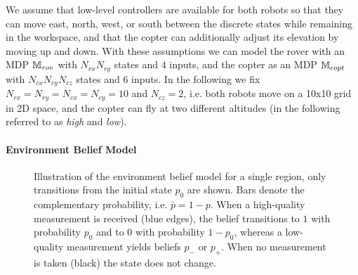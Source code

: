 \documentclass[conference]{IEEEtran}
\begin{document}
We assume that low-level controllers are available for both robots so that they can move east, north, west, or south between the discrete states while remaining in the workspace, and that the copter can additionally adjust its elevation by moving up and down. With these assumptions we can model the rover with an MDP $\mathbb{M}_{rov}$ with $N_{rx} N_{ry}$ states and $4$ inputs, and the copter as an MDP $\mathbb{M}_{copt}$ with $N_{cx} N_{cy} N_{cz}$ states and $6$ inputs. In the following we fix $N_{rx} = N_{ry} = N_{cx} = N_{cy} = 10$ and $N_{cz} = 2$, i.e. both robots move on a 10x10 grid in 2D space, and the copter can fly at two different altitudes (in the following referred to as \emph{high} and \emph{low}).


\paragraph{Environment Belief Model}

\begin{figure}
  \begin{center}
  \end{center}
  \vspace{-4mm}
  \caption{Illustration of the environment belief model for a single region, only transitions from the initial state $p_0$ are shown. Bars denote the complementary probability, i.e. $\bar p = 1-p$. When a high-quality measurement is received (blue edges), the belief transitions to $1$ with probability $p_0$ and to $0$ with probability $1-p_0$, whereas a low-quality measurement yields  beliefs $p_-$ or $p_+$. When no measurement is taken (black) the state does not change.}
  \label{fig:envmdp}
\end{figure}
\end{document}

